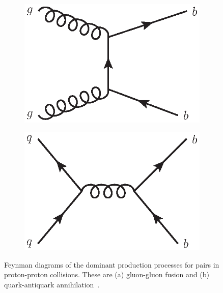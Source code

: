 \begin{figure}[!tb]
\centering
\begin{subfigure}{0.4\textwidth}
\includegraphics[width=\linewidth]{figs/detector/gluon_fusion.eps}
\caption{}
\label{fig:b-production:a}
\end{subfigure}
\begin{subfigure}{0.4\textwidth}
\includegraphics[width=\linewidth]{figs/detector/quark_antiquark_annihilation.eps}
\caption{}
\label{fig:b-production:b}
\end{subfigure}
\caption{Feynman diagrams of the dominant production processes for \bquark\bquarkbar pairs in proton-proton collisions. These are (a) gluon-gluon fusion and (b) quark-antiquark annihilation~\cite{b-production}.}
\label{fig:b-production}
\end{figure}

